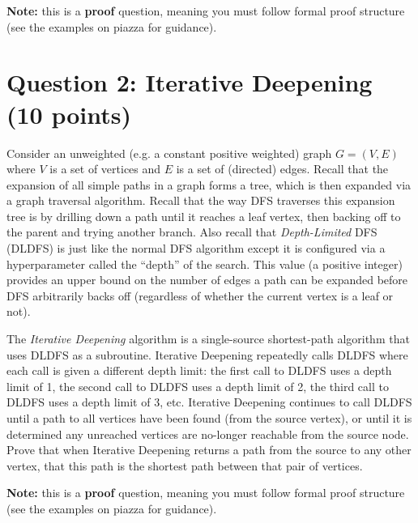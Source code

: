 \documentclass[11pt]{article}
\newcommand{\question}[1]{\section*{\normalsize #1}}
\begin{document}
\noindent\textbf{Note:} this is a \textbf{proof} question, meaning you must follow formal proof structure (see the examples on piazza for guidance).\newpage















\question{Question 2: Iterative Deepening (10 points)}
Consider an unweighted (e.g. a constant positive weighted) graph $G = (V, E)$ where $V$ is a set of vertices and $E$ is a set of (directed) edges. Recall that the expansion of all simple paths in a graph forms a tree, which is then expanded via a graph traversal algorithm. Recall that the way DFS traverses this expansion tree is by drilling down a path until it reaches a leaf vertex, then backing off to the parent and trying another branch. Also recall that \textit{Depth-Limited} DFS (DLDFS) is just like the normal DFS algorithm except it is configured via a hyperparameter called the ``depth'' of the search. This value (a positive integer) provides an upper bound on the number of edges a path can be expanded before DFS arbitrarily backs off (regardless of whether the current vertex is a leaf or not).\newline

\noindent The \textit{Iterative Deepening} algorithm is a single-source shortest-path algorithm that uses DLDFS as a subroutine. Iterative Deepening repeatedly calls DLDFS where each call is given a different depth limit: the first call to DLDFS uses a depth limit of 1, the second call to DLDFS uses a depth limit of 2, the third call to DLDFS uses a depth limit of 3, etc. Iterative Deepening continues to call DLDFS until a path to all vertices have been found (from the source vertex), or until it is determined any unreached vertices are no-longer reachable from the source node. Prove that when Iterative Deepening returns a path from the source to any other vertex, that this path is the shortest path between that pair of vertices.\newline

\noindent\textbf{Note:} this is a \textbf{proof} question, meaning you must follow formal proof structure (see the examples on piazza for guidance).\newpage
\end{document}
